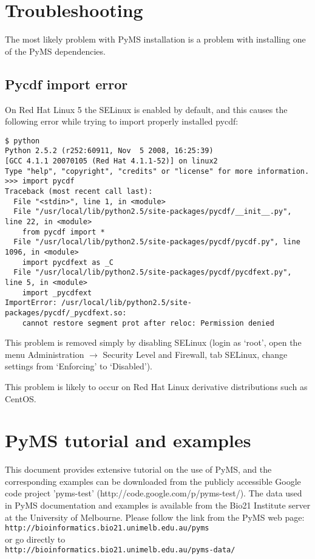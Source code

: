 \section{Troubleshooting}

The most likely problem with PyMS installation is a problem with
installing one of the PyMS dependencies.

\subsection{Pycdf import error}

On Red Hat Linux 5 the SELinux is enabled by default, and this causes the
following error while trying to import properly installed pycdf:

\begin{verbatim}
$ python
Python 2.5.2 (r252:60911, Nov  5 2008, 16:25:39)
[GCC 4.1.1 20070105 (Red Hat 4.1.1-52)] on linux2
Type "help", "copyright", "credits" or "license" for more information.
>>> import pycdf
Traceback (most recent call last):
  File "<stdin>", line 1, in <module>
  File "/usr/local/lib/python2.5/site-packages/pycdf/__init__.py", line 22, in <module>
    from pycdf import *
  File "/usr/local/lib/python2.5/site-packages/pycdf/pycdf.py", line 1096, in <module>
    import pycdfext as _C
  File "/usr/local/lib/python2.5/site-packages/pycdf/pycdfext.py", line 5, in <module>
    import _pycdfext
ImportError: /usr/local/lib/python2.5/site-packages/pycdf/_pycdfext.so:
    cannot restore segment prot after reloc: Permission denied
\end{verbatim}

This problem is removed simply by disabling SELinux (login as `root', open the
menu Administration $\rightarrow$ Security Level and Firewall, tab SELinux,
change settings from `Enforcing' to `Disabled').

This problem is likely to occur on Red Hat Linux derivative distributions such
as CentOS.

\section{PyMS tutorial and examples}

This document provides extensive tutorial on the use of PyMS, and the
corresponding examples can be downloaded from the publicly accessible
Google code project 'pyms-test' (http://code.google.com/p/pyms-test/). 
The data used in PyMS documentation and examples is available from the
Bio21 Institute server at the University of Melbourne. Please follow
the link from the PyMS web page:\\
{\tt http://bioinformatics.bio21.unimelb.edu.au/pyms}\\
or go directly to\\
{\tt http://bioinformatics.bio21.unimelb.edu.au/pyms-data/}\\

